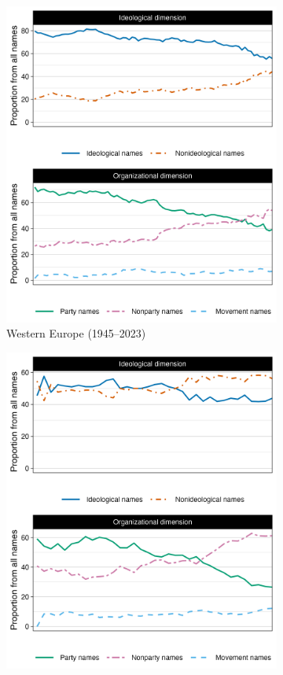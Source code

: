 \documentclass[12pt]{article}
\begin{document}
\begin{figure}[H]
\centering
\begin{subfigure}[t]{0.48\textwidth}
  \includegraphics[width=\textwidth]{./Figures/Figure3_west.png}
  \caption{Western Europe (1945--2023)}
\end{subfigure}
\hfill
\begin{subfigure}[t]{0.48\textwidth}
  \includegraphics[width=\textwidth]{./Figures/Figure3_east.png}

\end{subfigure}
\end{figure}
\end{document}
